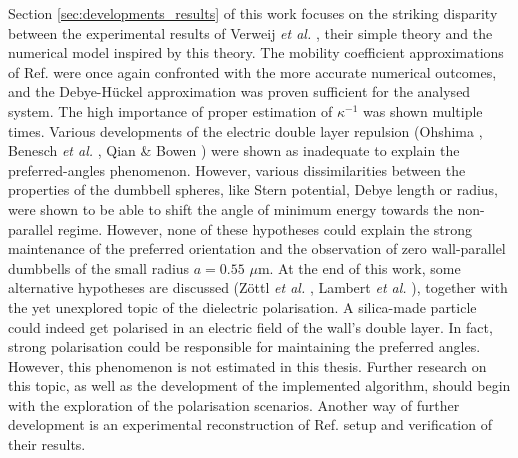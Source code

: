 \documentclass{master_thesis}
\begin{document}
Section \ref{sec:developments_results} of this work focuses on the striking disparity between the experimental results of Verweij \textit{et al.} \cite{verweij2021}, their simple theory and the numerical model inspired by this theory. The mobility coefficient approximations of Ref. \cite{lisicki2016} were once again confronted with the more accurate numerical outcomes, and the Debye-Hückel approximation was proven sufficient for the analysed system. The high importance of proper estimation of $\kappa^{-1}$ was shown multiple times. Various developments of the electric double layer repulsion (Ohshima \cite{ohshima1998}, Benesch \textit{et al.} \cite{benesch2005}, Qian \& Bowen \cite{qian1999}) were shown as inadequate to explain the preferred-angles phenomenon. However, various dissimilarities between the properties of the dumbbell spheres, like Stern potential, Debye length or radius, were shown to be able to shift the angle of minimum energy towards the non-parallel regime. However, none of these hypotheses could explain the strong maintenance of the preferred orientation and the observation of zero wall-parallel dumbbells of the small radius $a=0.55$ $\mu$m. At the end of this work, some alternative hypotheses are discussed (Zöttl \textit{et al.} \cite{zottl_2019}, Lambert \textit{et al.} \cite{lambert_2024}), together with the yet unexplored topic of the dielectric polarisation. A silica-made particle could indeed get polarised in an electric field of the wall's double layer. In fact, strong polarisation could be responsible for maintaining the preferred angles. However, this phenomenon is not estimated in this thesis. Further research on this topic, as well as the development of the implemented algorithm, should begin with the exploration of the polarisation scenarios. Another way of further development is an experimental reconstruction of Ref. \cite{verweij2021} setup and verification of their results.



\end{document}
